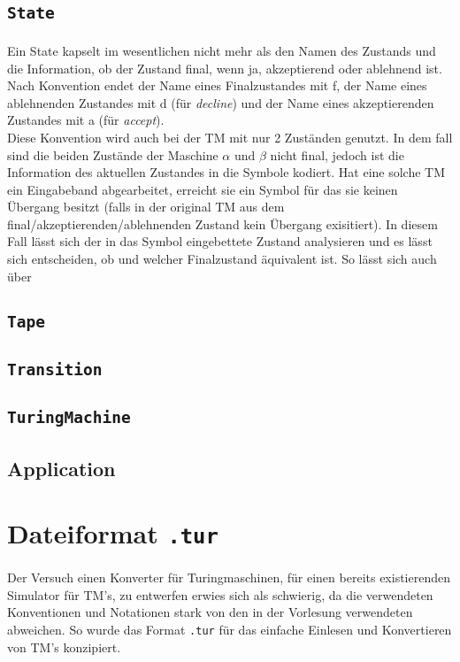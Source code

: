 \documentclass[10pt, a4paper]{article}
\newcommand{\ilc}{\texttt}
\begin{document}
\subsection*{\ilc{State}}
\paragraph*{}
Ein State kapselt im wesentlichen nicht mehr als den Namen des Zustands und die Information, ob der Zustand final, wenn ja, akzeptierend oder ablehnend ist. Nach Konvention endet der Name eines Finalzustandes mit f, der Name eines ablehnenden Zustandes mit d (für \textit{decline}) und der Name eines akzeptierenden Zustandes mit a (für \textit{accept}).\\
Diese Konvention wird auch bei der TM mit nur 2 Zuständen genutzt. In dem fall sind die beiden Zustände der Maschine $\alpha$ und $\beta$ nicht final, jedoch ist die Information des aktuellen Zustandes in die Symbole kodiert. Hat eine solche TM ein Eingabeband abgearbeitet, erreicht sie ein Symbol für das sie keinen Übergang besitzt (falls in der original TM aus dem final/akzeptierenden/ablehnenden Zustand kein Übergang exisitiert). In diesem Fall lässt sich der in das Symbol eingebettete Zustand analysieren und es lässt sich entscheiden, ob und welcher Finalzustand äquivalent ist. So lässt sich auch über  

\subsection*{\ilc{Tape}}
\subsection*{\ilc{Transition}}
\subsection*{\ilc{TuringMachine}}

\subsection*{Application}


\section*{Dateiformat \ilc{.tur}}
\paragraph*{}
Der Versuch einen Konverter für Turingmaschinen, für einen bereits existierenden Simulator für TM's, zu entwerfen erwies sich als schwierig, da die verwendeten Konventionen und Notationen stark von den in der Vorlesung verwendeten abweichen. So wurde das Format \ilc{.tur} für das einfache Einlesen und Konvertieren von TM's konzipiert.\par
\end{document}
